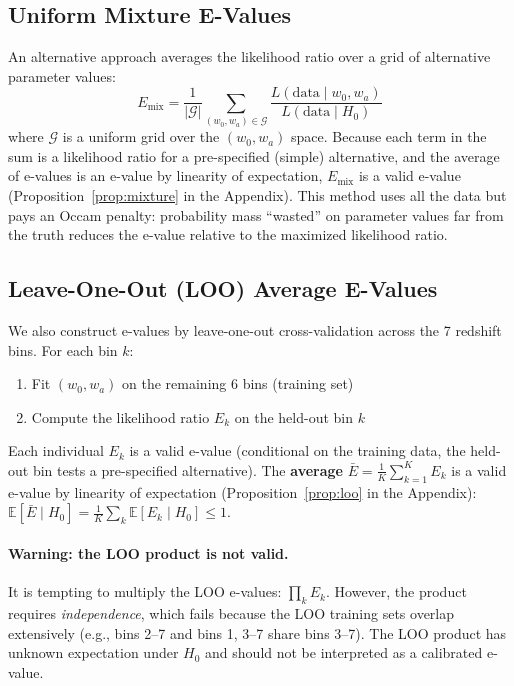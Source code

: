 \documentclass[11pt,a4paper]{article}
\newcommand{\E}{\mathbb{E}}
\begin{document}
\subsection{Uniform Mixture E-Values}

An alternative approach averages the likelihood ratio over a grid of alternative parameter values:
\begin{equation}
E_{\text{mix}} = \frac{1}{|\mathcal{G}|} \sum_{(w_0, w_a) \in \mathcal{G}} \frac{L(\text{data} \mid w_0, w_a)}{L(\text{data} \mid H_0)}
\end{equation}
where $\mathcal{G}$ is a uniform grid over the $(w_0, w_a)$ space. Because each term in the sum is a likelihood ratio for a pre-specified (simple) alternative, and the average of e-values is an e-value by linearity of expectation, $E_{\text{mix}}$ is a valid e-value (Proposition~\ref{prop:mixture} in the Appendix). This method uses all the data but pays an Occam penalty: probability mass ``wasted'' on parameter values far from the truth reduces the e-value relative to the maximized likelihood ratio.

\subsection{Leave-One-Out (LOO) Average E-Values}

We also construct e-values by leave-one-out cross-validation across the 7 redshift bins. For each bin $k$:
\begin{enumerate}
    \item Fit $(w_0, w_a)$ on the remaining 6 bins (training set)
    \item Compute the likelihood ratio $E_k$ on the held-out bin $k$
\end{enumerate}
Each individual $E_k$ is a valid e-value (conditional on the training data, the held-out bin tests a pre-specified alternative). The \textbf{average} $\bar{E} = \frac{1}{K}\sum_{k=1}^K E_k$ is a valid e-value by linearity of expectation (Proposition~\ref{prop:loo} in the Appendix): $\E[\bar{E} \mid H_0] = \frac{1}{K}\sum_k \E[E_k \mid H_0] \leq 1$.

\paragraph{Warning: the LOO product is not valid.} It is tempting to multiply the LOO e-values: $\prod_k E_k$. However, the product requires \textit{independence}, which fails because the LOO training sets overlap extensively (e.g., bins 2--7 and bins 1, 3--7 share bins 3--7). The LOO product has unknown expectation under $H_0$ and should not be interpreted as a calibrated e-value.
\end{document}
